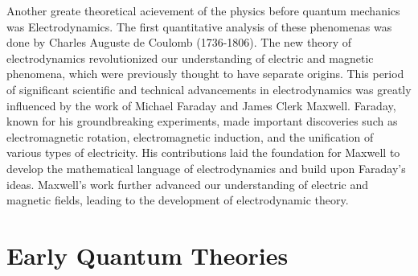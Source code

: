\documentclass[9pt,a4paper, twocolumn]{article}
\newcounter{theo}
\begin{document}
        Another greate theoretical acievement of the physics before quantum mechanics was Electrodynamics. The first quantitative analysis of these phenomenas was done by Charles Auguste de Coulomb (1736-1806). The new theory of electrodynamics revolutionized our understanding of electric and magnetic phenomena, which were previously thought to have separate origins. This period of significant scientific and technical advancements in electrodynamics was greatly influenced by the work of Michael Faraday and James Clerk Maxwell. Faraday, known for his groundbreaking experiments, made important discoveries such as electromagnetic rotation, electromagnetic induction, and the unification of various types of electricity. His contributions laid the foundation for Maxwell to develop the mathematical language of electrodynamics and build upon Faraday's ideas. Maxwell's work further advanced our understanding of electric and magnetic fields, leading to the development of electrodynamic theory.

    \section{Early Quantum Theories}
\end{document}
